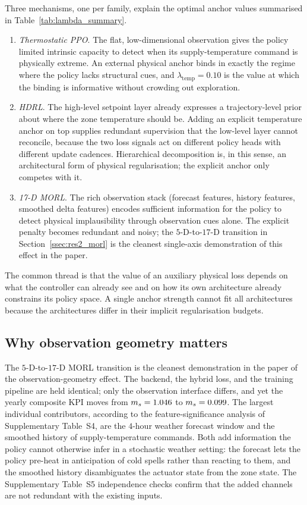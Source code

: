 Three mechanisms, one per family, explain the optimal anchor values
summarised in Table~\ref{tab:lambda_summary}.
\begin{enumerate}
    \item \emph{Thermostatic PPO}. The flat, low-dimensional
    observation gives the policy limited intrinsic capacity to detect
    when its supply-temperature command is physically extreme. An
    external physical anchor binds in exactly the regime where the
    policy lacks structural cues, and $\lambda_{\mathrm{temp}}=0.10$
    is the value at which the binding is informative without crowding
    out exploration.
    \item \emph{HDRL}. The high-level setpoint layer already expresses a
    trajectory-level prior about where the zone temperature should be.
    Adding an explicit temperature anchor on top supplies redundant
    supervision that the low-level layer cannot reconcile, because the
    two loss signals act on different policy heads with different
    update cadences. Hierarchical decomposition is, in this sense, an
    architectural form of physical regularisation; the explicit
    anchor only competes with it.
    \item \emph{17-D MORL}. The rich observation stack
    (forecast features, history features, smoothed delta features)
    encodes sufficient information for the policy to detect physical
    implausibility through observation cues alone. The explicit
    penalty becomes redundant and noisy; the $5$-D-to-$17$-D
    transition in Section~\ref{ssec:res2_morl} is the cleanest
    single-axis demonstration of this effect in the paper.
\end{enumerate}
The common thread is that the value of an auxiliary physical loss
depends on what the controller can already see and on how its own
architecture already constrains its policy space. A single anchor
strength cannot fit all architectures because the architectures
differ in their implicit regularisation budgets.

\subsection{Why observation geometry matters}
\label{ssec:dis_observation}

The $5$-D-to-$17$-D MORL transition is the cleanest demonstration in
the paper of the observation-geometry effect. The backend, the
hybrid loss, and the training pipeline are held identical; only the
observation interface differs, and yet the yearly composite KPI
moves from $m_s=1.046$ to $m_s=0.099$. The largest
individual contributors, according to the feature-significance
analysis of Supplementary Table~S4, are the $4$-hour weather forecast
window and the smoothed history of supply-temperature commands. Both
add information the policy cannot otherwise infer in a stochastic
weather setting: the forecast lets the policy pre-heat in
anticipation of cold spells rather than reacting to them, and the
smoothed history disambiguates the actuator state from the zone
state. The Supplementary Table~S5 independence checks confirm that
the added channels are not redundant with the existing inputs.

